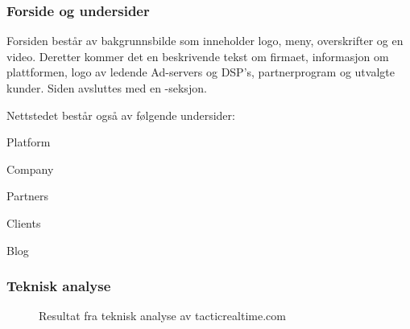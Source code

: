 \subsubsection{Forside og undersider}

Forsiden består av bakgrunnsbilde som inneholder logo, meny, overskrifter og en video.  
Deretter kommer det en beskrivende tekst om firmaet, informasjon om plattformen, logo av ledende  Ad-servers og DSP's, partnerprogram og utvalgte kunder. Siden avsluttes med en -seksjon.

Nettstedet består også av følgende undersider:
\begin{compactitem}
\item Platform
\item Company
\item Partners
\item Clients
\item Blog
\end{compactitem}

\subsubsection{Teknisk analyse}

\begin{figure}[H]
    \begin{center}
        \label{fig:competitors-tech_analysis-tacticrealtime.com}
        \caption{Resultat fra teknisk analyse av tacticrealtime.com}
    \end{center}
\end{figure}

